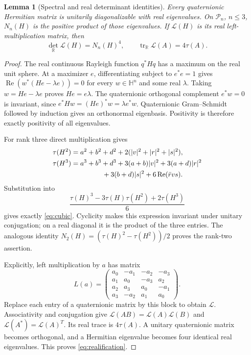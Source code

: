 \documentclass[11pt,a4paper]{article}
\numberwithin{equation}{section}
\newtheorem{lemma}[theorem]{Lemma}
\theoremstyle{definition}
\theoremstyle{remark}
\newcommand{\HH}{\mathbb H}
\newcommand{\RR}{\mathbb R}
\newcommand{\PP}{\mathcal P}
\newcommand{\Rea}{\operatorname{Re}}
\newcommand{\tr}{\operatorname{tr}}
\newcommand{\rtr}{\tau}
\begin{document}
\begin{lemma}[Spectral and real determinant identities]\label{lem:spectral}
Every quaternionic Hermitian matrix is unitarily diagonalizable with real
eigenvalues. On $\PP_n$, $n\le3$, $N_n(H)$ is the positive product of those
eigenvalues. If $\mathscr L(H)$ is its real left-multiplication matrix, then
\begin{equation}\label{eq:realification}
\det_{\RR}\mathscr L(H)=N_n(H)^4,
\qquad \tr_{\RR}\mathscr L(A)=4\rtr(A).
\end{equation}
\end{lemma}
\begin{proof}
The real continuous Rayleigh function $q^*Hq$ has a maximum on the real
unit sphere. At a maximizer $e$, differentiating subject to $e^*e=1$
gives $\Rea(w^*(He-\lambda e))=0$ for every $w\in\HH^n$ and some
real $\lambda$. Taking $w=He-\lambda e$ proves $He=e\lambda$.
The quaternionic orthogonal complement $e^*w=0$ is invariant, since
$e^*Hw=(He)^*w=\lambda e^*w$. Quaternionic Gram--Schmidt followed by
induction gives an orthonormal eigenbasis. Positivity is therefore exactly
positivity of all eigenvalues.

For rank three direct multiplication gives
\begin{align*}
\rtr(H^2)&=a^2+b^2+d^2+2(|v|^2+|r|^2+|s|^2),\\
\rtr(H^3)&=a^3+b^3+d^3+3(a+b)|v|^2+3(a+d)|r|^2\\
&\hspace{16mm}+3(b+d)|s|^2+6\Rea(\bar r v s).
\end{align*}
Substitution into
\[
\frac{\rtr(H)^3-3\rtr(H)\rtr(H^2)+2\rtr(H^3)}6
\]
gives exactly \eqref{eq:cubic}. Cyclicity makes this expression invariant
under unitary conjugation; on a real diagonal it is the product of the
three entries. The analogous identity
$N_2(H)=(\rtr(H)^2-\rtr(H^2))/2$ proves the rank-two assertion.

Explicitly, left multiplication by $a$ has matrix
\[
L(a)=\begin{pmatrix}
a_0&-a_1&-a_2&-a_3\\
a_1&a_0&-a_3&a_2\\
a_2&a_3&a_0&-a_1\\
a_3&-a_2&a_1&a_0
\end{pmatrix}.
\]
Replace each entry of a quaternionic matrix by this block to obtain
$\mathscr L$. Associativity and conjugation give
$\mathscr L(AB)=\mathscr L(A)\mathscr L(B)$ and
$\mathscr L(A^*)=\mathscr L(A)^T$. Its real trace is $4\rtr(A)$.
A unitary quaternionic matrix becomes orthogonal, and a Hermitian
eigenvalue becomes four identical real eigenvalues. This proves
\eqref{eq:realification}.
\end{proof}
\end{document}
